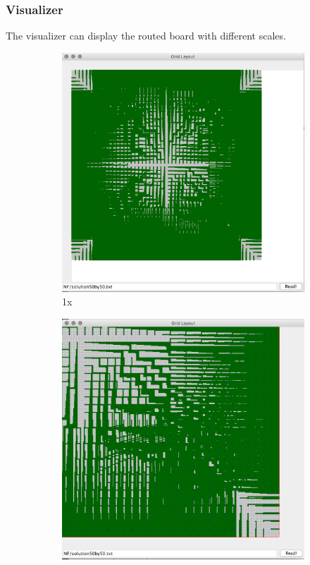 \documentclass{article}
\begin{document}
\begin{spacing}{1.1}
    \subsubsection{Visualizer}
    \label{VIS}
    The visualizer can display the routed board with different scales.
    \begin{figure}[H]
        \centering
        \begin{subfigure}{0.25\textwidth}
            \includegraphics[width = \textwidth]{vis1.png}
            \caption{1x}
        \end{subfigure}
        \begin{subfigure}{0.25\textwidth}
            \includegraphics[width = \textwidth]{vis2.png}

\end{subfigure}
\end{figure}
\end{spacing}
\end{document}
